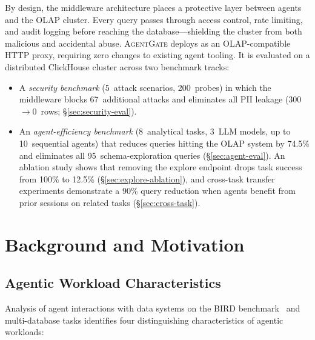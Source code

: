 \documentclass[sigconf, nonacm]{acmart}
\newcommand{\sysname}{\textsc{AgentGate}\xspace}  %
\begin{document}
By design, the middleware architecture places a protective layer between
agents and the OLAP cluster.  Every query passes through access control,
rate limiting, and audit logging before reaching the database---shielding
the cluster from both malicious and accidental abuse.  \sysname deploys as
an OLAP-compatible HTTP proxy, requiring zero changes to existing agent
tooling.  It is evaluated on a distributed ClickHouse cluster across two
benchmark tracks:

\begin{itemize}[leftmargin=*]
  \item A \emph{security benchmark} (5~attack scenarios, 200~probes) in
        which the middleware blocks 67~additional attacks and eliminates all
        PII leakage (300$\to$0~rows; \S\ref{sec:security-eval}).

  \item An \emph{agent-efficiency benchmark} (8~analytical tasks, 3~LLM
        models, up to 10~sequential agents) that reduces queries hitting the
        OLAP system by 74.5\% and eliminates all 95~schema-exploration
        queries (\S\ref{sec:agent-eval}).  An ablation study shows that
        removing the explore endpoint drops task success from 100\% to 12.5\%
        (\S\ref{sec:explore-ablation}), and cross-task transfer experiments
        demonstrate a 90\% query reduction when agents benefit from prior
        sessions on related tasks (\S\ref{sec:cross-task}).
\end{itemize}


\section{Background and Motivation}
\label{sec:background}

\subsection{Agentic Workload Characteristics}

Analysis of agent interactions with data systems on the
BIRD benchmark~\cite{li2024bird,liu2025sao} and multi-database tasks
identifies four distinguishing characteristics of agentic workloads:
\end{document}
